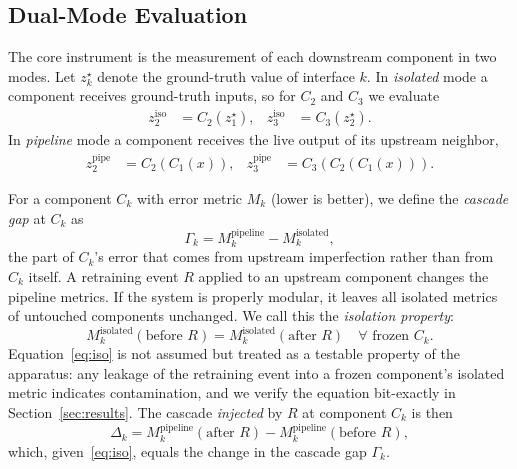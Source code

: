 \documentclass[conference]{IEEEtran}
\begin{document}
\subsection{Dual-Mode Evaluation}
The core instrument is the measurement of each downstream component in two
modes. Let $z_k^{\star}$ denote the ground-truth value of interface $k$. In
\emph{isolated} mode a component receives ground-truth inputs, so for $C_2$ and
$C_3$ we evaluate
\begin{align}
z_2^{\text{iso}} &= C_2(z_1^{\star}), &
z_3^{\text{iso}} &= C_3(z_2^{\star}).
\label{eq:iso-mode}
\end{align}
In \emph{pipeline} mode a component receives the live output of its upstream
neighbor,
\begin{align}
z_2^{\text{pipe}} &= C_2(C_1(x)), &
z_3^{\text{pipe}} &= C_3(C_2(C_1(x))).
\label{eq:pipe-mode}
\end{align}

For a component $C_k$ with error metric $M_k$ (lower is better), we define the
\emph{cascade gap} at $C_k$ as
\begin{equation}
\Gamma_k = M_k^{\text{pipeline}} - M_k^{\text{isolated}},
\label{eq:gap}
\end{equation}
the part of $C_k$'s error that comes from upstream imperfection rather than
from $C_k$ itself. A retraining event $R$ applied to an upstream component
changes the pipeline metrics. If the system is properly modular, it leaves all
isolated metrics of untouched components unchanged. We call this the
\emph{isolation property}:
\begin{equation}
M_k^{\text{isolated}}(\text{before } R) = M_k^{\text{isolated}}(\text{after } R)
\quad \forall \text{ frozen } C_k.
\label{eq:iso}
\end{equation}
Equation~\eqref{eq:iso} is not assumed but treated as a testable property of
the apparatus: any leakage of the retraining event into a frozen component's
isolated metric indicates contamination, and we verify the equation bit-exactly
in Section~\ref{sec:results}. The cascade \emph{injected} by $R$ at component
$C_k$ is then
\begin{equation}
\Delta_k = M_k^{\text{pipeline}}(\text{after } R) - M_k^{\text{pipeline}}(\text{before } R),
\label{eq:inj}
\end{equation}
which, given~\eqref{eq:iso}, equals the change in the cascade gap $\Gamma_k$.
\end{document}
